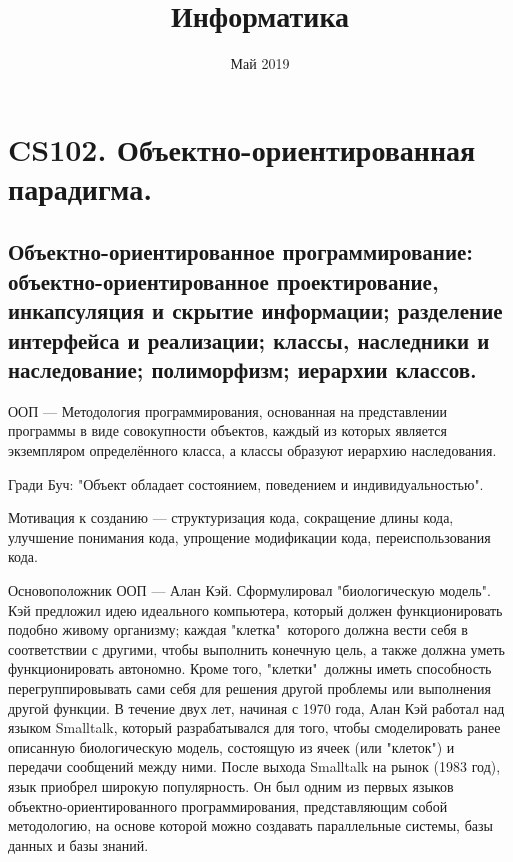 \documentclass[12pt, a4paper]{article}
\title{Информатика}
\date{Май 2019}
\begin{document}
\maketitle

\section{CS102. Объектно-ориентированная парадигма.}

\subsection{Объектно-ориентированное программирование: объектно-ориентированное проектирование, инкапсуляция и скрытие информации; разделение интерфейса и реализации; классы, наследники и наследование; полиморфизм; иерархии классов.}

ООП --- Методология программирования, основанная на представлении программы в виде совокупности объектов, каждый из которых является экземпляром определённого класса, а классы образуют иерархию наследования.

Гради Буч: "Объект обладает состоянием, поведением и индивидуальностью"{}.

Мотивация к созданию --- структуризация кода, сокращение длины кода, улучшение понимания кода, упрощение модификации кода, переиспользования кода.

Основоположник ООП --- Алан Кэй. Сформулировал "биологическую модель". Кэй предложил идею идеального компьютера, который должен функционировать подобно живому организму; каждая "клетка"\ которого должна вести себя в соответствии с другими, чтобы выполнить конечную цель, а также должна уметь функционировать автономно. Кроме того, "клетки"\ должны иметь способность перегруппировывать сами себя для решения другой проблемы или выполнения другой функции.
В течение двух лет, начиная с 1970 года, Алан Кэй работал над языком Smalltalk, который разрабатывался для того, чтобы смоделировать ранее описанную биологическую модель, состоящую из ячеек (или "клеток"{}) и передачи сообщений между ними. После выхода Smalltalk на рынок (1983 год), язык приобрел широкую популярность. Он был одним из первых языков объектно-ориентированного программирования, представляющим собой методологию, на основе которой можно создавать параллельные системы, базы данных и базы знаний.
\end{document}

